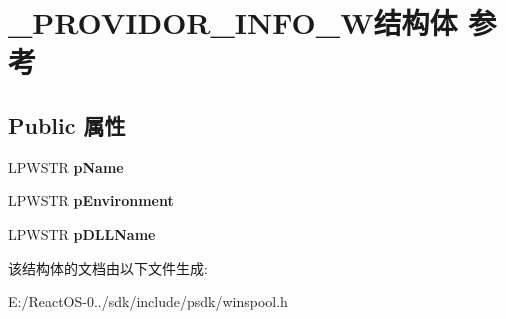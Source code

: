 \hypertarget{struct___p_r_o_v_i_d_o_r___i_n_f_o__1_w}{}\section{\+\_\+\+P\+R\+O\+V\+I\+D\+O\+R\+\_\+\+I\+N\+F\+O\+\_\+W结构体 参考}
\label{struct___p_r_o_v_i_d_o_r___i_n_f_o__1_w}
\subsection*{Public 属性}
\begin{DoxyCompactItemize}
\item 
\mbox{\label{struct___p_r_o_v_i_d_o_r___i_n_f_o__1_w_a5cabb9ef7629474e4b61b1a9bced987d}} 
L\+P\+W\+S\+TR {\bfseries p\+Name}
\item 
\mbox{\label{struct___p_r_o_v_i_d_o_r___i_n_f_o__1_w_acebc35e4749490f9ac4d5af0c394e1fe}} 
L\+P\+W\+S\+TR {\bfseries p\+Environment}
\item 
\mbox{\label{struct___p_r_o_v_i_d_o_r___i_n_f_o__1_w_a7155187221f6a6e8b54e11a1d015b399}} 
L\+P\+W\+S\+TR {\bfseries p\+D\+L\+L\+Name}
\end{DoxyCompactItemize}


该结构体的文档由以下文件生成\+:\begin{DoxyCompactItemize}
\item 
E\+:/\+React\+O\+S-\/0../sdk/include/psdk/winspool.\+h\end{DoxyCompactItemize}
